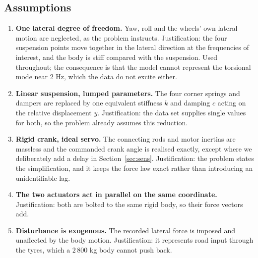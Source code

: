 \documentclass[12pt]{apmcmthesis}
\begin{document}
\subsection{Assumptions}
\begin{enumerate}
  \item \textbf{One lateral degree of freedom.} Yaw, roll and the wheels' own lateral motion are
  neglected, as the problem instructs. Justification: the four suspension points move together in
  the lateral direction at the frequencies of interest, and the body is stiff compared with the
  suspension. Used throughout; the consequence is that the model cannot represent the torsional
  mode near $2$ Hz, which the data do not excite either.
  \item \textbf{Linear suspension, lumped parameters.} The four corner springs and dampers are
  replaced by one equivalent stiffness $k$ and damping $c$ acting on the relative displacement
  $y$. Justification: the data set supplies single values for both, so the problem already assumes
  this reduction.
  \item \textbf{Rigid crank, ideal servo.} The connecting rods and motor inertias are massless and
  the commanded crank angle is realised exactly, except where we deliberately add a delay in
  Section~\ref{sec:sens}. Justification: the problem states the simplification, and it keeps the
  force law exact rather than introducing an unidentifiable lag.
  \item \textbf{The two actuators act in parallel on the same coordinate.} Justification: both are
  bolted to the same rigid body, so their force vectors add.
  \item \textbf{Disturbance is exogenous.} The recorded lateral force is imposed and unaffected by
  the body motion. Justification: it represents road input through the tyres, which a $2\,800$ kg
  body cannot push back.
\end{enumerate}
\end{document}
